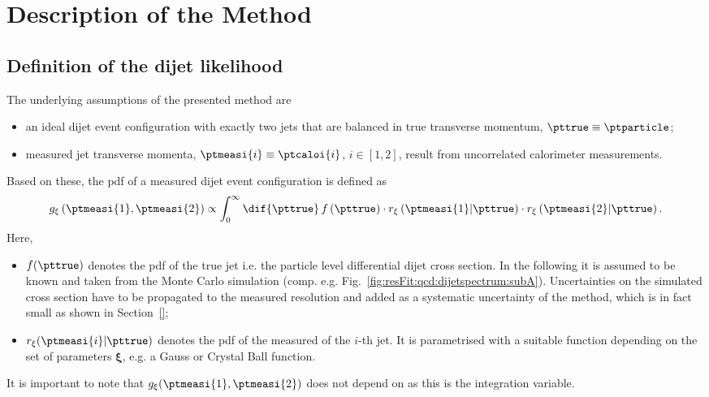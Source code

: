 

\section{Description of the Method}\label{sec:ResFit:Method}

\subsection{Definition of the dijet likelihood}\label{sec:ResFit:Method:Likelihood}

The underlying assumptions of the presented method are
\begin{itemize}
\item an ideal dijet event configuration with exactly two jets that
  are balanced in true transverse momentum, \mbox{$\pttrue\equiv\ptparticle$};
\item measured jet transverse momenta,
  \mbox{$\ptmeasi{i}\equiv\ptcaloi{i}$}, $i\in[1,2]$, result from uncorrelated
  calorimeter measurements.
\end{itemize}
Based on these, the pdf of a measured dijet event configuration is defined as
\begin{equation}
  \label{eq:resFit:DijetPdf}
  g_{\mathbf{\xi}}\left(\ptmeasi{1},\ptmeasi{2}\right) \propto \int^{\infty}_{0}\dif{\pttrue}\,f\left(\pttrue\right)
  \cdot r_{\mathbf{\xi}}\left(\ptmeasi{1}|\pttrue\right)
  \cdot r_{\mathbf{\xi}}\left(\ptmeasi{2}|\pttrue\right).
\end{equation}
Here,
\begin{itemize}
\item $f(\pttrue)$ denotes the pdf of the true jet \pt
  i.e. the particle level differential dijet cross section.
  In the following it is assumed to be known
  and taken from the Monte Carlo simulation
  (comp. e.g. Fig.~\ref{fig:resFit:qcd:dijetspectrum:subA}).
  Uncertainties on the simulated cross section have to be propagated to
  the measured resolution and added as a systematic uncertainty of the
  method, which is in fact small as shown in Section~\ref{};
\item $r_{\mathbf{\xi}}(\ptmeasi{i}|\pttrue)$ denotes the pdf of the measured \pt
  of the $i$-th jet.
  It is parametrised with a suitable function depending on the set of
  parameters $\mathbf{\xi}$, e.g. a Gauss or Crystal Ball function.
\end{itemize}
It is important to note that
$g_{\mathbf{\xi}}(\ptmeasi{1},\ptmeasi{2})$ does not depend on \pttrue
as this is the integration variable.

